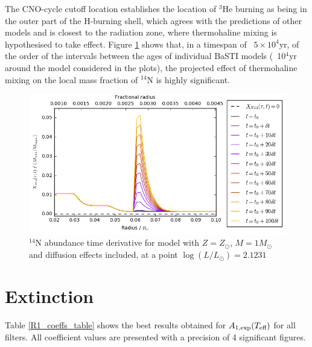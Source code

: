 \documentclass[12pt, a4paper]{report}
\begin{document}
The CNO-cycle cutoff location establishes the location of $^{3}$He burning as being in the outer part of the H-burning shell, which agrees with the predictions of other models and is closest to the radiation zone, where thermohaline mixing is hypothesised to take effect. Figure \ref{dXN14/dt_colour} shows that, in a timespan of ~$5 \times 10^{4}$yr, of the order of the intervals between the ages of individual BaSTI models (~10$^{4}$yr around the model considered in the plots), the projected effect of thermohaline mixing on the local mass fraction of $^{14}$N is highly significant.

\begin{figure}
\begin{center}
\includegraphics[scale=0.7]{../mu_test_data/mu_test_graphs/eq_logL=2p1231_time_diff_eq_Dvar_10dt_dmu_k_lim_crop.png}
\caption{$^{14}$N abundance time derivative for model with $Z = Z_{\odot}$, $M = 1M_{\odot}$ and diffusion effects included, at a point $\log(L/L_{\odot}) = 2.1231$}
\label{dXN14/dt_colour}
\end{center}
\end{figure}

\section{Extinction}
Table \ref{R1_coeffs_table} shows the best results obtained for $A_{1,\textnormal{exp}} (T_{\textnormal{eff}})$ for all filters. All coefficient values are presented with a precision of 4 significant figures. 
\end{document}
